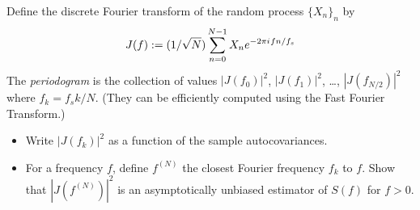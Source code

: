 \documentclass[11pt]{article}
\begin{document}
\begin{exercise}
Define the discrete Fourier transform of the random process $\{X_n\}_n$ by
\begin{equation}
    J(f) := (1/\sqrt{N})\sum_{n=0}^{N-1} X_n e^{-2\pi{i\mkern1mu} f n/f_s}
\end{equation}
The \textit{periodogram} is the collection of values $|J(f_0)|^2$, $|J(f_1)|^2$, \dots, $|J(f_{N/2})|^2$ where $f_k = f_s k/N$.
(They can be efficiently computed using the Fast Fourier Transform.)
\begin{itemize}
    \item Write $|J(f_k)|^2$ as a function of the sample autocovariances.
    \item For a frequency $f$, define $f^{(N)}$ the closest Fourier frequency $f_k$ to $f$.
    Show that $|J(f^{(N)})|^2$ is an asymptotically unbiased estimator of $S(f)$ for $f>0$.
\end{itemize}
\end{exercise}
\end{document}

